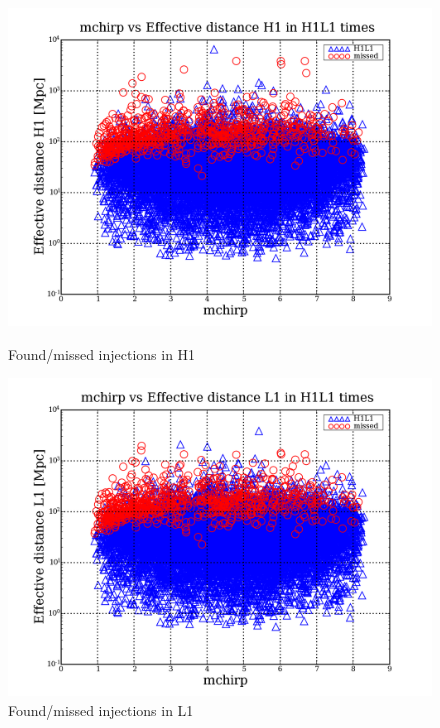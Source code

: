 \documentclass[epsf]{article}
\begin{document}
\begin{figure}[ht]
\begin{minipage}[b]{0.5\linewidth}
\centering
\includegraphics[scale=0.15]{Foundmissed_INJ_H1.png}
\caption{Found/missed injections in H1}
\label{fig:figure12}
\end{minipage}
\hspace{0.5cm}
\begin{minipage}[b]{0.5\linewidth}
\centering
\includegraphics[scale=0.15]{Foundmissed_INJ_L1.png}
\caption{Found/missed injections in L1}
\label{fig:figure13}
\end{minipage}
\end{figure}
 
\end{document}
